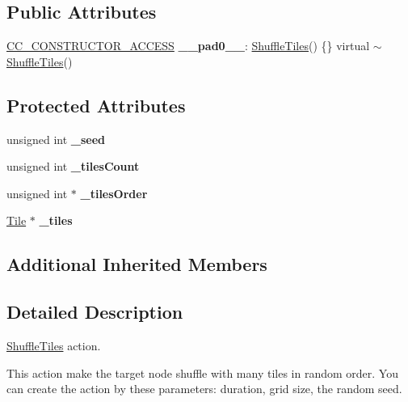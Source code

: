 \subsection*{Public Attributes}
\begin{DoxyCompactItemize}
\item 
\mbox{\label{classShuffleTiles_aad7d579ef292d7bbca4ba07eb52a454b}} 
\hyperlink{_2cocos2d_2cocos_2base_2ccConfig_8h_a25ef1314f97c35a2ed3d029b0ead6da0}{C\+C\+\_\+\+C\+O\+N\+S\+T\+R\+U\+C\+T\+O\+R\+\_\+\+A\+C\+C\+E\+SS} {\bfseries \+\_\+\+\_\+pad0\+\_\+\+\_\+}\+: \hyperlink{classShuffleTiles}{Shuffle\+Tiles}() \{\} virtual $\sim$\hyperlink{classShuffleTiles}{Shuffle\+Tiles}()
\end{DoxyCompactItemize}
\subsection*{Protected Attributes}
\begin{DoxyCompactItemize}
\item 
\mbox{\label{classShuffleTiles_ae30d64ae8379d5ba30aee6f494b57626}} 
unsigned int {\bfseries \+\_\+seed}
\item 
\mbox{\label{classShuffleTiles_aa324af52efb705c62a7d9b88284d7a08}} 
unsigned int {\bfseries \+\_\+tiles\+Count}
\item 
\mbox{\label{classShuffleTiles_a8e2f9d654558e4318497cf95d0b8f42a}} 
unsigned int $\ast$ {\bfseries \+\_\+tiles\+Order}
\item 
\mbox{\label{classShuffleTiles_acbb5b44f6fcbc2272da1f24881987d2b}} 
\hyperlink{structTile}{Tile} $\ast$ {\bfseries \+\_\+tiles}
\end{DoxyCompactItemize}
\subsection*{Additional Inherited Members}


\subsection{Detailed Description}
\hyperlink{classShuffleTiles}{Shuffle\+Tiles} action. 

This action make the target node shuffle with many tiles in random order. You can create the action by these parameters\+: duration, grid size, the random seed. 

